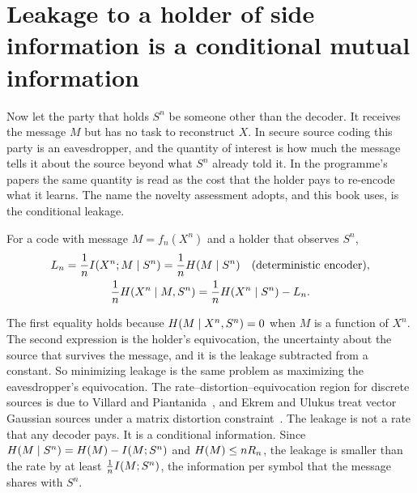 \section{Leakage to a holder of side information is a conditional mutual information}\label{sec:ch03:leakage}

Now let the party that holds $S^n$ be someone other than the decoder. It receives the message $M$ but has no task to reconstruct $X$. In secure source coding this party is an eavesdropper, and the quantity of interest is how much the message tells it about the source beyond what $S^n$ already told it. In the programme's papers the same quantity is read as the cost that the holder pays to re-encode what it learns. The name the novelty assessment adopts, and this book uses, is the conditional leakage.

\begin{definition}\label{def:ch03:leak}
For a code with message $M=f_n(X^n)$ and a holder that observes $S^n$,
\begin{equation}\label{eq:ch03:leak}
\begin{gathered}
L_n=\frac1nI(X^n;M\mid S^n)=\frac1nH(M\mid S^n)\quad\text{(deterministic encoder)},\\
\frac1nH(X^n\mid M,S^n)=\frac1nH(X^n\mid S^n)-L_n .
\end{gathered}
\end{equation}
\end{definition}

The first equality holds because $H(M\mid X^n,S^n)=0$ when $M$ is a function of $X^n$. The second expression is the holder's equivocation, the uncertainty about the source that survives the message, and it is the leakage subtracted from a constant. So minimizing leakage is the same problem as maximizing the eavesdropper's equivocation. The rate--distortion--equivocation region for discrete sources is due to Villard and Piantanida~\cite{villard2013}, and Ekrem and Ulukus treat vector Gaussian sources under a matrix distortion constraint~\cite{ekrem2013}. The leakage is not a rate that any decoder pays. It is a conditional information. Since $H(M\mid S^n)=H(M)-I(M;S^n)$ and $H(M)\le nR_n$, the leakage is smaller than the rate by at least $\frac1nI(M;S^n)$, the information per symbol that the message shares with $S^n$.

